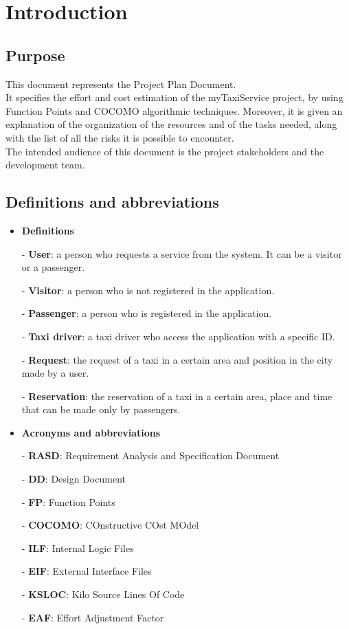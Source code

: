 \newpage
\section{Introduction}
	\subsection{Purpose}
		This document represents the Project Plan Document.\\ It specifies the effort and cost estimation of the myTaxiService project, by using Function Points and COCOMO algorithmic techniques. Moreover, it is given an explanation of the organization of the resources and of the tasks needed, along with the list of all the risks it is possible to encounter.\\
		The intended audience of this document is the project stakeholders and the development team.
	\subsection{Definitions and abbreviations}
		\begin{itemize}
			\item \textbf{Definitions}
			\item[-] \textbf{User}: a person who requests a service from the system. It can be a visitor or a passenger.
			\item[-] \textbf{Visitor}: a person who is not registered in the application.
			\item[-] \textbf{Passenger}: a person who is registered in the application.
			\item[-] \textbf{Taxi driver}: a taxi driver who access the application with a specific ID.
			\item[-] \textbf{Request}: the request of a taxi in a certain area and position in the city made by a user.
			\item[-] \textbf{Reservation}: the reservation of a taxi in a certain area, place and time that can be made only by passengers.
	
			\item \textbf{Acronyms and abbreviations}
			\item[-] \textbf{RASD}: Requirement Analysis and Specification Document
			\item[-] \textbf{DD}: Design Document
			\item[-] \textbf{FP}: Function Points
			\item[-] \textbf{COCOMO}: COnstructive COst MOdel
			\item[-] \textbf{ILF}: Internal Logic Files
			\item[-] \textbf{EIF}: External Interface Files
			\item[-] \textbf{KSLOC}: Kilo Source Lines Of Code
			\item[-] \textbf{EAF}: Effort Adjustment Factor
		\end{itemize}
	
